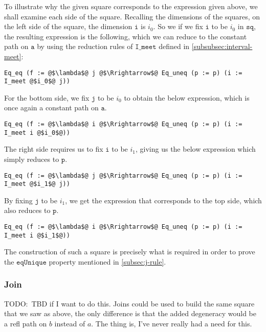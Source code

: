 \documentclass[12pt,twoside,maitrise]{dms}
\theoremstyle{definition}
\numberwithin{equation}{section}
\numberwithin{table}{chapter}
\numberwithin{figure}{chapter}
\newcommand\fn[1] {\texttt{#1}}
\begin{document}
To illustrate why the given square corresponds to the expression given above, we
shall examine each side of the square. Recalling the dimensions of the squares,
on the left side of the square, the dimension $\fn{i}$ is $i_0$. So we if we fix
$\fn{i}$ to be $i_0$ in $\fn{sq}$, the resulting expression is the following,
which we can reduce to the constant path on $\fn{a}$ by using the reduction
rules of $\fn{I\_meet}$ defined in \autoref{subsubsec:interval-meet}:

\begin{verbatim}
Eq_eq (f := @$\lambda$@ j @$\Rrightarrow$@ Eq_uneq (p := p) (i := I_meet @$i_0$@ j))
\end{verbatim}

For the bottom side, we fix $\fn{j}$ to be $i_0$ to obtain the below expression,
which is once again a constant path on $\fn{a}$.

\begin{verbatim}
Eq_eq (f := @$\lambda$@ i @$\Rrightarrow$@ Eq_uneq (p := p) (i := I_meet i @$i_0$@))
\end{verbatim}

The right side requires us to fix $\fn{i}$ to be $i_1$, giving us the below
expression which simply reduces to $\fn{p}$.

\begin{verbatim}
Eq_eq (f := @$\lambda$@ j @$\Rrightarrow$@ Eq_uneq (p := p) (i := I_meet @$i_1$@ j))
\end{verbatim}

By fixing $\fn{j}$ to be $i_1$, we get the expression that corresponds to the top side, which also reduces to $\fn{p}$.

\begin{verbatim}
Eq_eq (f := @$\lambda$@ i @$\Rrightarrow$@ Eq_uneq (p := p) (i := I_meet i @$i_1$@))
\end{verbatim}

The construction of such a square is precisely what is required in order to
prove the $\fn{eqUnique}$ property mentioned in \autoref{subsec:j-rule}.

\subsubsection*{Join}

TODO:\ TBD if I want to do this. Joins could be used to build the same square
that we saw as above, the only difference is that the added degeneracy would be
a refl path on $b$ instead of $a$. The thing is, I've never really had a need
for this.
\end{document}
